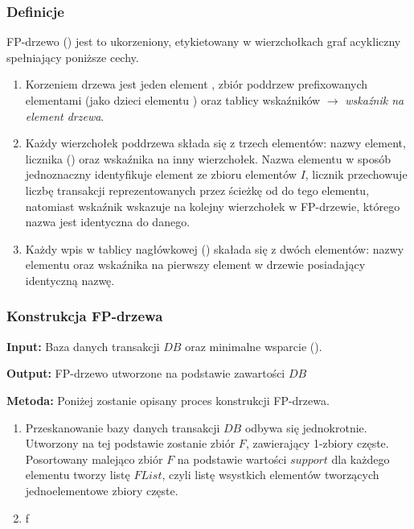 \subsubsection{Definicje}
\begin{df}\label{fptree:def}
FP-drzewo () jest to ukorzeniony, etykietowany w wierzchołkach graf acykliczny spełniający poniższe cechy.
\end{df}
\begin{enumerate}
	\item Korzeniem drzewa jest jeden element , zbiór poddrzew prefixowanych elementami (jako dzieci elementu ) oraz tablicy wskaźników  $\rightarrow$ \emph{wskaźnik na element drzewa}.
	\item Każdy wierzchołek poddrzewa składa się z trzech elementów: nazwy element, licznika () oraz wskaźnika na inny wierzchołek. Nazwa elementu w sposób jednoznaczny identyfikuje element ze zbioru elementów $I$, licznik przechowuje liczbę transakcji reprezentowanych przez ścieżkę od  do tego elementu, natomiast wskaźnik wskazuje na kolejny wierzchołek w FP-drzewie, którego nazwa jest identyczna do danego.
	\item Każdy wpis w tablicy nagłówkowej () skałada się z dwóch elementów: nazwy elementu oraz wskaźnika na pierwszy element w drzewie posiadający identyczną nazwę.
\end{enumerate}

\subsubsection{Konstrukcja FP-drzewa}
\textbf{Input:} Baza danych transakcji $DB$ oraz minimalne wsparcie ().

\textbf{Output:} FP-drzewo utworzone na podstawie zawartości $DB$

\textbf{Metoda:} Poniżej zostanie opisany proces konstrukcji FP-drzewa.

\begin{enumerate}
	\item Przeskanowanie bazy danych transakcji $DB$ odbywa się jednokrotnie. Utworzony na tej podstawie zostanie zbiór $F$, zawierający 1-zbiory częste. Posortowany malejąco zbiór $F$ na podstawie wartości $support$ dla każdego elementu tworzy listę $FList$, czyli listę wsystkich elementów tworzących jednoelementowe zbiory częste.
	\item f
\end{enumerate}

